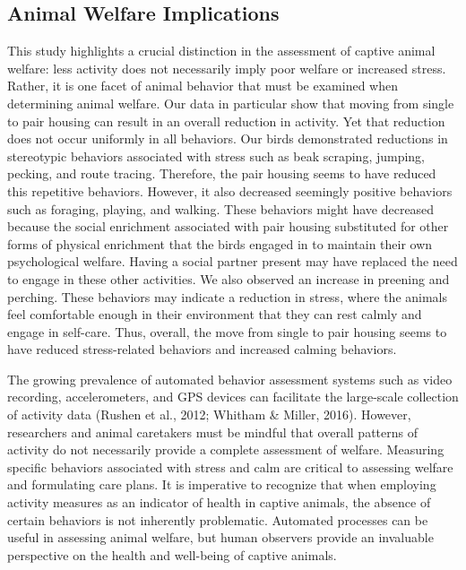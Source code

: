 \documentclass[
  pub]{apa6}
\begin{document}
\hypertarget{animal-welfare-implications}{%
\subsection{Animal Welfare Implications}\label{animal-welfare-implications}}

This study highlights a crucial distinction in the assessment of captive animal welfare: less activity does not necessarily imply poor welfare or increased stress. Rather, it is one facet of animal behavior that must be examined when determining animal welfare. Our data in particular show that moving from single to pair housing can result in an overall reduction in activity. Yet that reduction does not occur uniformly in all behaviors. Our birds demonstrated reductions in stereotypic behaviors associated with stress such as beak scraping, jumping, pecking, and route tracing. Therefore, the pair housing seems to have reduced this repetitive behaviors. However, it also decreased seemingly positive behaviors such as foraging, playing, and walking. These behaviors might have decreased because the social enrichment associated with pair housing substituted for other forms of physical enrichment that the birds engaged in to maintain their own psychological welfare. Having a social partner present may have replaced the need to engage in these other activities. We also observed an increase in preening and perching. These behaviors may indicate a reduction in stress, where the animals feel comfortable enough in their environment that they can rest calmly and engage in self-care. Thus, overall, the move from single to pair housing seems to have reduced stress-related behaviors and increased calming behaviors.

The growing prevalence of automated behavior assessment systems such as video recording, accelerometers, and GPS devices can facilitate the large-scale collection of activity data (Rushen et al., 2012; Whitham \& Miller, 2016). However, researchers and animal caretakers must be mindful that overall patterns of activity do not necessarily provide a complete assessment of welfare. Measuring specific behaviors associated with stress and calm are critical to assessing welfare and formulating care plans. It is imperative to recognize that when employing activity measures as an indicator of health in captive animals, the absence of certain behaviors is not inherently problematic. Automated processes can be useful in assessing animal welfare, but human observers provide an invaluable perspective on the health and well-being of captive animals.
\end{document}
